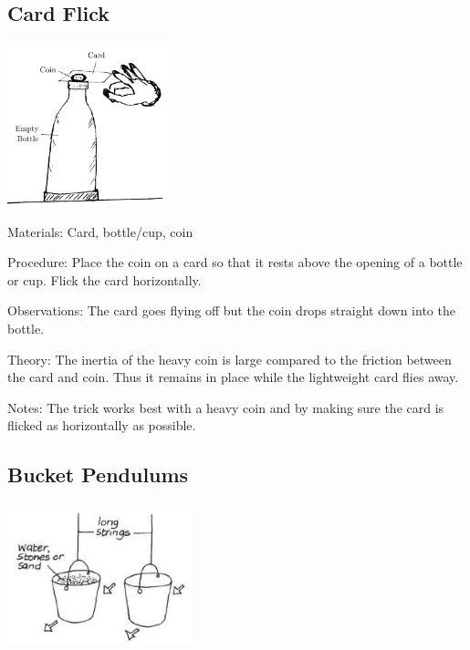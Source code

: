 \begin{multicols}{2}
\subsection{Card Flick}

\begin{center}
\includegraphics[width=0.35\textwidth]{./img/inertia.png}
\end{center}

\begin{description*}
\item[Materials:]{Card, bottle/cup, coin}
\item[Procedure:]{Place the coin on a card so that it rests above the opening of a bottle or cup. Flick the card horizontally.}
\item[Observations:]{The card goes flying off but the coin drops straight down into the bottle.}
\item[Theory:]{The inertia of the heavy coin is large compared to the friction between the card and coin. Thus it remains in place while the lightweight card flies away.}
\item[Notes:]{The trick works best with a heavy coin and by making sure the card is flicked as horizontally as possible.}
\end{description*}

\subsection{Bucket Pendulums}

\begin{center}
\includegraphics[width=0.4\textwidth]{./img/vso/bucket-pendulums.jpg}
\end{center}


\end{multicols}
